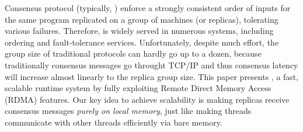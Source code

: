 


Consensus protocol (typically, \paxos) enforce a strongly consistent order of 
inputs for the same program replicated on a group of machines (or replicas), 
tolerating various failures. Therefore, \paxos is widely 
served in numerous systems, including ordering and fault-tolerance services. 
Unfortunately, despite much effort, the group size of traditional \paxos 
protocols can hardly go up to a dozen, because traditionally consensus messages 
go throught TCP/IP and thus consensus latency will increase almost linearly to 
the replica group size. This paper presents \xxx, a fast, scalable \paxos 
runtime system by fully exploiting Remote Direct Memory Access (RDMA) features. 
Our key idea to achieve scalability is making \paxos replicas receive consensus 
messages \emph{purely on local memory}, just like making threads communicate 
with other threads efficiently via bare memory.

